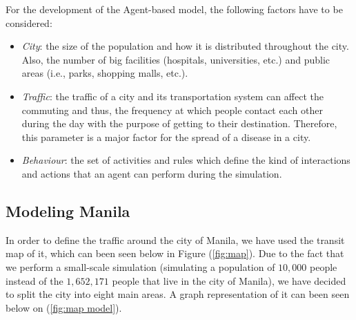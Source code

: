 \documentclass[a4paper]{article}
\begin{document}
For the development of the Agent-based model, the following factors have to be considered:
\begin{itemize}
\item \textit{City}: the size of the population and how it is distributed throughout the city. Also, the number of big  facilities (hospitals, universities, etc.) and public areas (i.e., parks, shopping malls, etc.).
\item \textit{Traffic}: the traffic of a city and its transportation system can affect the commuting and thus, the frequency at which people contact each other during the day with the purpose of getting to their destination. Therefore, this parameter is a major factor for the spread of a disease in a city.
\item \textit{Behaviour}: the set of activities and rules which define the kind of interactions and actions that an agent can perform during the simulation.
\end{itemize} 

\subsection{Modeling Manila}
In order to define the traffic around the city of Manila, we have used the transit map of it, which can been seen below in Figure (\ref{fig:map}). Due to the fact that we perform a small-scale simulation (simulating a population of $10,000$ people instead of the $1,652,171$ people that live in the city of Manila), we have decided to split the city into eight main areas. A graph representation of it can been seen below on (\ref{fig:map model}).
\end{document}
